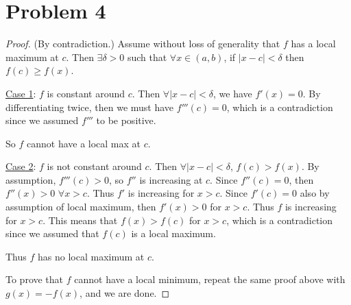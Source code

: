 \documentclass{article}
\begin{document}
\section*{Problem 4}
\begin{proof}
	(By contradiction.) Assume without loss of generality that $f$ has a local maximum at $c$. Then $\exists \delta > 0$ such that $\forall x \in (a, b)$, if $|x - c| < \delta$ then $f(c) \geq f(x)$.
	
	\underline{Case 1}: $f$ is constant around $c$. Then $\forall |x - c| < \delta$, we have $f'(x) = 0$. By differentiating twice, then we must have $f'''(c) = 0$, which is a contradiction since we assumed $f'''$ to be positive.
	
	So $f$ cannot have a local max at $c$.
	
	\underline{Case 2}: $f$ is not constant around $c$. Then $\forall |x - c| < \delta$, $f(c) > f(x)$. By assumption, $f'''(c) > 0$, so $f''$ is increasing at $c$. Since $f''(c) = 0$, then $f''(x) > 0$ $\forall x > c$. Thus $f'$ is increasing for $x > c$. Since $f'(c)=0$ also by assumption of local maximum, then $f'(x) > 0$ for $x > c$. Thus $f$ is increasing for $x > c$. This means that $f(x) > f(c)$ for $x > c$, which is a contradiction since we assumed that $f(c)$ is a local maximum.
	
	Thus $f$ has no local maximum at $c$. 
	
	To prove that $f$ cannot have a local minimum, repeat the same proof above with $g(x) = -f(x)$, and we are done.
\end{proof}
\end{document}

